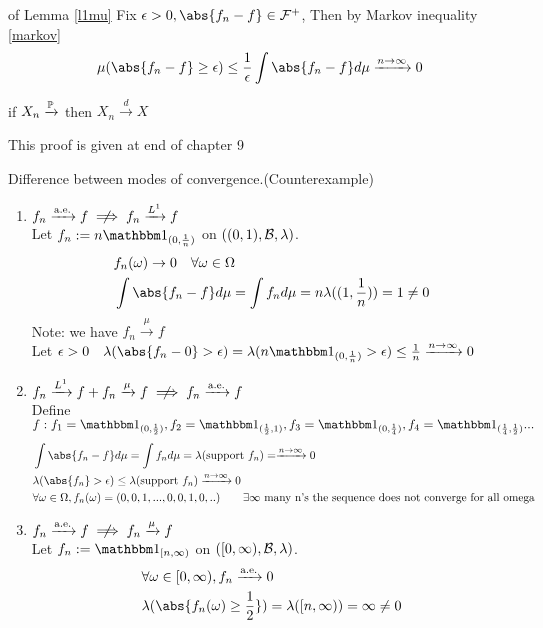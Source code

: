 \pf of Lemma \ref{l1mu} Fix $\epsilon >0, \abs{f_n - f}\in \F^+$, Then by Markov inequality \ref{markov}
\begin{equation*}
    \mu(\abs{f_n-f} \geq \epsilon) \leq \frac{1}{\epsilon}\int \abs{f_n-f} d\mu \xrightarrow{n\rightarrow \infty} 0
\end{equation*}
\begin{lem}
if $X_n \xrightarrow{\mathbb{P}}$ then $X_n \xrightarrow{d} X$
\end{lem}
This proof is given at end of chapter 9
\newpage
\begin{example}Difference between modes of convergence.(Counterexample)
\begin{enumerate}
    \item $f_n \xrightarrow{\text{a.e.}}f \notimplies f_n \xrightarrow{\ls{1}}f$ \\
    Let $f_n := n \I_{(0,\frac{1}{n})}$ on $((0,1),\mathcal{B}, \lambda)$.
    \begin{align*}
        &f_n(\omega) \rightarrow 0 \quad \forall \omega \in \Omega \\
        &\int \abs{f_n - f} d\mu = \int f_n d\mu = n\lambda((1, \frac{1}{n})) = 1 \neq 0
    \end{align*}Note: we have $f_n \xrightarrow{\mu}f$ \\
    Let $\epsilon > 0\quad \lambda(\abs{f_n-0} > \epsilon) = \lambda(n\I_{(0,\frac{1}{n})} > \epsilon) \leq \frac{1}{n} \xrightarrow{n \rightarrow \infty}  0$
    \item $f_n \xrightarrow{\ls{1}}f + f_n \xrightarrow{\mu}f \notimplies f_n \xrightarrow{\text{a.e.}}f$ \\
    Define $f: f_1 = \I_{(0,\frac{1}{2})}, f_2 = \I_{(\frac{1}{2},1)}, f_3 = \I_{(0,\frac{1}{4})}, f_4 = \I_{(\frac{1}{4},\frac{1}{2})} ...$
    \begin{align*}
        &\int \abs{f_n - f} d\mu = \int f_n d\mu = \lambda(\text{support }f_n) = \xrightarrow{n \rightarrow \infty}  0 \\
        &\lambda(\abs{f_n} > \epsilon) \leq \lambda(\text{support }f_n) \xrightarrow{n \rightarrow \infty}  0 \\
        &\forall \omega\in\Omega, f_n(\omega) = (0,0,1,...,0,0,1,0,..)\qquad \exists\infty \text{ many n's the sequence does not converge for all omega}
    \end{align*}
    \item $f_n \xrightarrow{\text{a.e.}}f \notimplies f_n \xrightarrow{\mu}f$ \\
    Let $f_n := \I_{[n,\infty)}$ on $([0,\infty),\mathcal{B}, \lambda)$.
    \begin{align*}
       & \forall \omega\in [0,\infty), f_n \xrightarrow{\text{a.e.}} 0 \\
       &\lambda(\abs{f_n(\omega) \geq \frac{1}{2}}) = \lambda([n,\infty)) =\infty \neq 0 \\
    \end{align*}
\end{enumerate}
\end{example}

